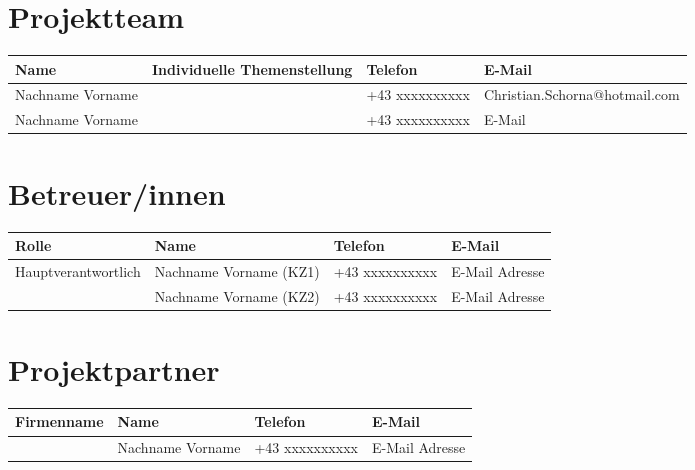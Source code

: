 \documentclass[12pt]{article}
\begin{document}


\section*{Projektteam}
\begin{tabularx}{\textwidth}{| p{} | p{} | p{} | X |}
    \hline
    \textbf{Name} & \textbf{Individuelle Themenstellung} & \textbf{Telefon} & \textbf{E-Mail} \\
    \hline
    Nachname Vorname &  & +43 xxxxxxxxxx & Christian.Schorna@hotmail.com \\
    \hline
    Nachname Vorname &  & +43 xxxxxxxxxx & E-Mail \\
    \hline
\end{tabularx}

\section*{Betreuer/innen}
\begin{center}
    \begin{tabularx}{\textwidth}{| p{} | p{} | p{} | X |}
        \hline
        \textbf{Rolle} & \textbf{Name} & \textbf{Telefon} & \textbf{E-Mail} \\
        \hline
        Hauptverantwortlich & Nachname Vorname (KZ1) & +43 xxxxxxxxxx & E-Mail Adresse \\
        \hline
         & Nachname Vorname (KZ2) & +43 xxxxxxxxxx & E-Mail Adresse \\
        \hline
    \end{tabularx}
\end{center}

\section*{Projektpartner}
\begin{center}
    \begin{tabularx}{\textwidth}{| p{} | p{} | p{} | X |}
        \hline
        \textbf{Firmenname} & \textbf{Name} & \textbf{Telefon} & \textbf{E-Mail} \\
        \hline
         & Nachname Vorname & +43 xxxxxxxxxx & E-Mail Adresse \\
        \hline
    \end{tabularx}
\end{center}
\end{document}
